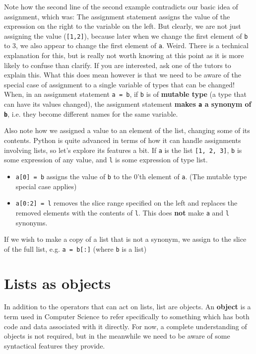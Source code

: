 Note how the second line of the second example contradicts our basic idea   of assignment, which was: The assignment statement assigns the value of   the expression on the right to the variable on the left. But clearly,   we are not just assigning the value (\texttt{[1,2]}), because later when we   change the first element of \texttt{b} to 3, we also appear to change the   first element of \texttt{a}. Weird. There is a technical explanation for this,   but is really not worth knowing at this point as it is more likely to   confuse than clarify. If you are interested, ask one of the tutors to explain this. What this does mean however is that we need to be   aware of the special case of assignment to a single variable of   types that can be changed!     When, in an assignment statement 
\texttt{a = b}, if \texttt{b} is of    \textbf{mutable type} (a type that can have its values     changed), the assignment statement    \textbf{makes \texttt{a} a synonym of \texttt{b}}, i.e. they become    different names for the same variable.    

Also note how we assigned a value to an element of the list,   changing some of its contents. Python is quite advanced in terms of   how it can handle assignments involving lists, so let's explore its   features a bit. If \texttt{a} is the list \texttt{[1, 2, 3]}, \texttt{b} is some expression of   any value, and \texttt{l} is some expression of type list.
\begin{itemize}
	\item 
\texttt{a[0] = b} assigns the value of \texttt{b} to the 0'th    element of \texttt{a}. (The mutable type special case applies)
	\item 
\texttt{a[0:2] = l} removes the slice range specified on    the left and replaces the removed elements with the contents of    \texttt{l}. This does \textbf{not} make \texttt{a} and \texttt{l} synonyms.
\end{itemize}

If we wish to make a copy of a list that is not a synonym, we assign   to the slice of the full list, e.g. 
\texttt{a = b[:]} (where \texttt{b} is   a list)

\section{Lists as objects}

In addition to the operators that can act on lists, list are   objects. An \textbf{object} is a term used in Computer Science to   refer specifically to something which has both code and data associated   with it directly. For now, a complete understanding of objects is not required, but in the meanwhile we need to be aware of some   syntactical features they provide.

